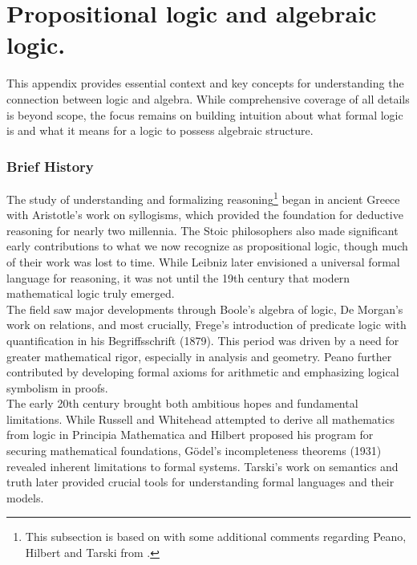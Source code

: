 \chapter{Propositional logic and algebraic logic.}

This appendix provides essential context and key concepts for understanding the connection between logic and algebra. While comprehensive coverage of all details is beyond scope, the focus remains on building intuition about what formal logic is and what it means for a logic to possess algebraic structure. 

\subsection*{Brief History}

The study of understanding and formalizing reasoning\footnote{This subsection is based on \cite[p.~5-8]{ConciseLogicBook} with some additional comments regarding Peano, Hilbert and Tarski from \cite{MathLogicBook}.} began in ancient Greece with Aristotle's work on syllogisms, which provided the foundation for deductive reasoning for nearly two millennia. The Stoic philosophers also made significant early contributions to what we now recognize as propositional logic, though much of their work was lost to time. While Leibniz later envisioned a universal formal language for reasoning, it was not until the 19th century that modern mathematical logic truly emerged.\\

The field saw major developments through Boole's algebra of logic, De Morgan's work on relations, and most crucially, Frege's introduction of predicate logic with quantification in his Begriffsschrift (1879). This period was driven by a need for greater mathematical rigor, especially in analysis and geometry. Peano further contributed by developing formal axioms for arithmetic and emphasizing logical symbolism in proofs.\\

The early 20th century brought both ambitious hopes and fundamental limitations. While Russell and Whitehead attempted to derive all mathematics from logic in Principia Mathematica and Hilbert proposed his program for securing mathematical foundations, Gödel's incompleteness theorems (1931) revealed inherent limitations to formal systems. Tarski's work on semantics and truth later provided crucial tools for understanding formal languages and their models.\\


